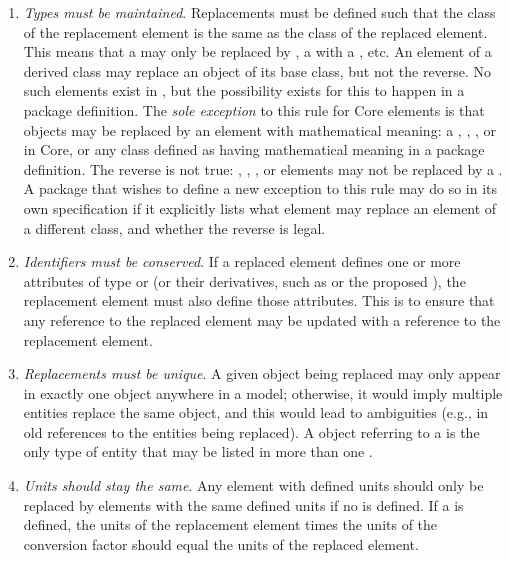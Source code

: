 \begin{enumerate}

\item \emph{Types must be maintained}.  Replacements must be defined such
  that the class of the replacement element is the same as the class
  of the replaced element.  This means that a \Species
  may only be replaced by \Species, a \Reaction with a \Reaction, etc.
  An element of a derived class may replace an object of
  its base class, but not the reverse.  No such elements exist in
  \sbmlthreecore, but the possibility exists for this to happen in a package definition.
  The \emph{sole exception} to this rule for Core elements is that \Parameter
  objects may be replaced by an element with mathematical meaning: a
  \Compartment, \Reaction, \Species, or \SpeciesReference in Core, or any
  class defined as having mathematical meaning in a package definition.
  The reverse is not true:  \Compartment, \Reaction, \Species, or
  \SpeciesReference elements may not be replaced by a \Parameter.
  A package that wishes to define a new exception to this rule may do so
  in its own specification if it explicitly lists what element may replace
  an element of a different class, and whether the reverse is legal.

\item \emph{Identifiers must be conserved}.  If a replaced element
  defines one or more attributes of type  or 
  (or their derivatives, such as  or the proposed
  ), the replacement element must also define those
  attributes.  This is to ensure that any reference to the replaced
  element may be updated with a reference to the replacement element.

\item \emph{Replacements must be unique}.  A given object
  being replaced may only appear in exactly one \ReplacedElement object
  anywhere in a model; otherwise, it would imply multiple entities
  replace the same object, and this would lead to ambiguities (e.g., in
  old references to the entities being replaced).  A \ReplacedElement
  object referring to a \Deletion is the only type of entity
  that may be listed in more than one \ListOfReplacedElements.

\item \emph{Units should stay the same}.  Any element with defined units
  should only be replaced by elements with the same defined units if no
   is defined.  If a  is
  defined, the units of the replacement element times the units of the
  conversion factor should equal the units of the replaced element.
  

\end{enumerate}
